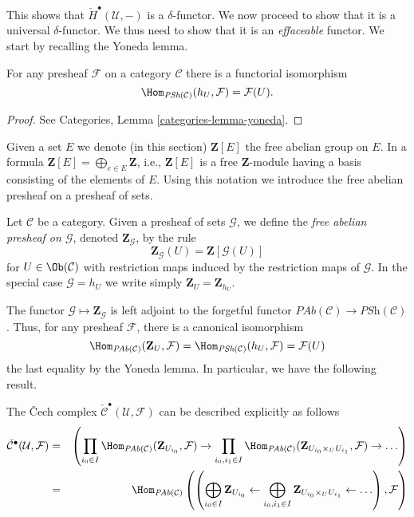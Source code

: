 \noindent
This shows that $\check{H}^\bullet(\mathcal{U}, -)$ is a $\delta$-functor.
We now proceed to show that it is a universal $\delta$-functor. We thus need to
show that it is an {\it effaceable} functor. We start by recalling the Yoneda
lemma.

\begin{lemma}
\label{lemma-yoneda-presheaf}
For any presheaf $\mathcal{F}$ on a category $\mathcal{C}$ there is a
functorial isomorphism
$$
\Hom_{\textit{PSh}(\mathcal{C})}(h_U, \mathcal{F}) =
\mathcal{F}(U).
$$
\end{lemma}

\begin{proof}
See Categories, Lemma \ref{categories-lemma-yoneda}.
\end{proof}

\noindent
Given a set $E$ we denote (in this section)
$\mathbf{Z}[E]$ the free abelian group on $E$. In a formula
$\mathbf{Z}[E] = \bigoplus_{e \in E} \mathbf{Z}$, i.e., $\mathbf{Z}[E]$ is
a free $\mathbf{Z}$-module having a basis consisting of the elements of $E$.
Using this notation we introduce the free abelian presheaf on a
presheaf of sets.

\begin{definition}
\label{definition-free-abelian-presheaf}
Let $\mathcal{C}$ be a category.
Given a presheaf of sets $\mathcal{G}$, we define the
{\it free abelian presheaf on $\mathcal{G}$},
denoted $\mathbf{Z}_\mathcal{G}$, by the rule
$$
\mathbf{Z}_\mathcal{G}(U)
=
\mathbf{Z}[\mathcal{G}(U)]
$$
for $U \in \Ob(\mathcal{C})$
with restriction maps induced by the restriction maps of $\mathcal{G}$.
In the special case $\mathcal{G} = h_U$ we write simply
$\mathbf{Z}_U = \mathbf{Z}_{h_U}$.
\end{definition}

\noindent
The functor $\mathcal{G} \mapsto \mathbf{Z}_\mathcal{G}$ is left adjoint to the
forgetful functor $\textit{PAb}(\mathcal{C}) \to \textit{PSh}(\mathcal{C})$.
Thus, for any presheaf $\mathcal{F}$, there is a canonical isomorphism
$$
\Hom_{\textit{PAb}(\mathcal{C})}(\mathbf{Z}_U, \mathcal{F})
=
\Hom_{\textit{PSh}(\mathcal{C})}(h_U, \mathcal{F})
=
\mathcal{F}(U)
$$
the last equality by the Yoneda lemma. In particular, we have the following
result.

\begin{lemma}
\label{lemma-cech-complex-describe}
The {\v C}ech complex $\check{\mathcal{C}}^\bullet(\mathcal{U}, \mathcal{F})$
can be described explicitly as follows
\begin{eqnarray*}
\check{\mathcal{C}}^\bullet(\mathcal{U}, \mathcal{F})
& = &
\left(
\prod_{i_0 \in I}
\Hom_{\textit{PAb}(\mathcal{C})}(\mathbf{Z}_{U_{i_0}}, \mathcal{F}) \to
\prod_{i_0, i_1 \in I}
\Hom_{\textit{PAb}(\mathcal{C})}(
\mathbf{Z}_{U_{i_0} \times_U U_{i_1}}, \mathcal{F}) \to \ldots
\right) \\
& = &
\Hom_{\textit{PAb}(\mathcal{C})}\left(
\left(
\bigoplus_{i_0 \in I} \mathbf{Z}_{U_{i_0}} \leftarrow
\bigoplus_{i_0, i_1 \in I} \mathbf{Z}_{U_{i_0} \times_U U_{i_1}} \leftarrow
\ldots
\right), \mathcal{F}\right)
\end{eqnarray*}
\end{lemma}

